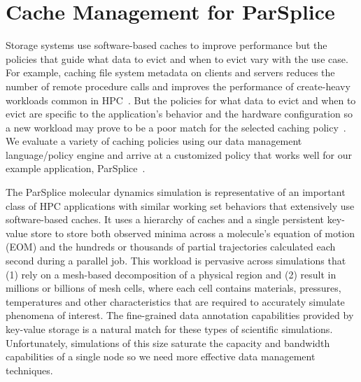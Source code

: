 %
%

\section{Cache Management for ParSplice}

Storage systems use software-based caches to improve performance but the
policies that guide what data to evict and when to evict vary with the use
case. For example, caching file system metadata on clients and servers reduces
the number of remote procedure calls and improves the performance of
create-heavy workloads common in HPC~\cite{ren:sc2014-indexfs,
patil:fast2011-giga+, weil:sc2004-dyn-metadata}. But the policies for what data
to evict and when to evict are specific to the application's behavior and the
hardware configuration so a new workload may prove to be a poor match for the
selected caching
policy~\cite{xiao:socc15-shardfs,brandt:msst2003-lh,sevilla:sc15-mantle,
weil:sc2004-dyn-metadata, weil:osdi2006-ceph}. We evaluate a variety of caching
policies using our data management language/policy engine and arrive at a
customized policy that works well for our example application,
ParSplice~\cite{perez:jctc20150parsplice}.

The ParSplice molecular dynamics simulation is representative of an important
class of HPC applications with similar working set behaviors that extensively
use software-based caches. It uses a hierarchy of caches and a single
persistent key-value store to store both observed minima across a molecule's
equation of motion (EOM) and the hundreds or thousands of partial trajectories
calculated each second during a parallel job.  This workload is pervasive
across simulations that (1) rely on a mesh-based decomposition of a physical
region and (2) result in millions or billions of mesh cells, where each cell
contains materials, pressures, temperatures and other characteristics that are
required to accurately simulate phenomena of interest.  The fine-grained data
annotation capabilities provided by key-value storage is a natural match for
these types of scientific simulations.  Unfortunately, simulations of this size
saturate the capacity and bandwidth capabilities of a single node so we need
more effective data management techniques.

